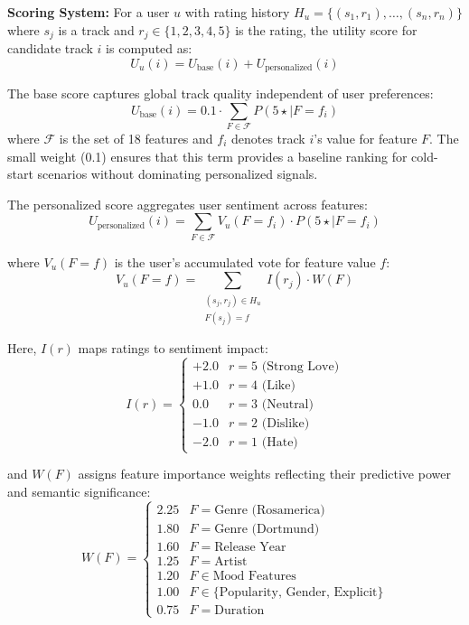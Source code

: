 \documentclass[12pt,a4paper]{article}
\begin{document}
\textbf{Scoring System:} For a user $u$ with rating history $H_u = \{(s_1, r_1), \ldots, (s_n, r_n)\}$ where $s_j$ is a track and $r_j \in \{1,2,3,4,5\}$ is the rating, the utility score for candidate track $i$ is computed as:
\begin{equation}
U_u(i) = U_{\text{base}}(i) + U_{\text{personalized}}(i)
\end{equation}

The base score captures global track quality independent of user preferences:
\begin{equation}
U_{\text{base}}(i) = 0.1 \cdot \sum_{F \in \mathcal{F}} P(5\star \mid F = f_i)
\end{equation}
where $\mathcal{F}$ is the set of 18 features and $f_i$ denotes track $i$'s value for feature $F$. The small weight (0.1) ensures that this term provides a baseline ranking for cold-start scenarios without dominating personalized signals.

The personalized score aggregates user sentiment across features:
\begin{equation}
U_{\text{personalized}}(i) = \sum_{F \in \mathcal{F}} V_u(F = f_i) \cdot P(5\star \mid F = f_i)
\end{equation}

where $V_u(F = f)$ is the user's accumulated vote for feature value $f$:
\begin{equation}
V_u(F = f) = \sum_{\substack{(s_j, r_j) \in H_u \\ F(s_j) = f}} I(r_j) \cdot W(F)
\end{equation}

Here, $I(r)$ maps ratings to sentiment impact:
\begin{equation}
I(r) = \begin{cases}
+2.0 & r = 5 \text{ (Strong Love)} \\
+1.0 & r = 4 \text{ (Like)} \\
0.0 & r = 3 \text{ (Neutral)} \\
-1.0 & r = 2 \text{ (Dislike)} \\
-2.0 & r = 1 \text{ (Hate)}
\end{cases}
\end{equation}

and $W(F)$ assigns feature importance weights reflecting their predictive power and semantic significance:
\begin{equation}
W(F) = \begin{cases}
2.25 & F = \text{Genre (Rosamerica)} \\
1.80 & F = \text{Genre (Dortmund)} \\
1.60 & F = \text{Release Year} \\
1.25 & F = \text{Artist} \\
1.20 & F \in \text{Mood Features} \\
1.00 & F \in \{\text{Popularity, Gender, Explicit}\} \\
0.75 & F = \text{Duration}
\end{cases}
\end{equation}
\end{document}
